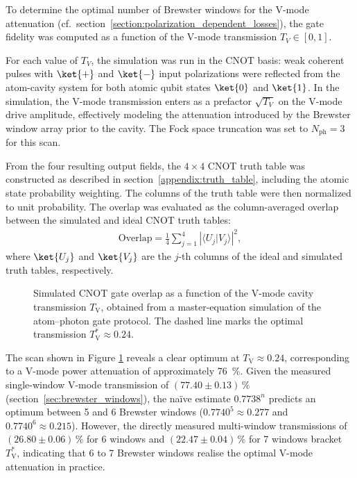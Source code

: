 To determine the optimal number of Brewster windows for the V-mode attenuation (cf.\ section~\ref{section:polarization_dependent_losses}), the gate fidelity was computed as a function of the V-mode transmission $T_V \in [0, 1]$.

For each value of $T_V$, the simulation was run in the CNOT basis: weak coherent pulses with $\ket{+}$ and $\ket{-}$ input polarizations were reflected from the atom-cavity system for both atomic qubit states $\ket{0}$ and $\ket{1}$. In the simulation, the V-mode transmission enters as a prefactor $\sqrt{T_V}$ on the V-mode drive amplitude, effectively modeling the attenuation introduced by the Brewster window array prior to the cavity. The Fock space truncation was set to $N_{\text{ph}} = 3$ for this scan.

From the four resulting output fields, the $4 \times 4$ CNOT truth table was constructed as described in section~\ref{appendix:truth_table}, including the atomic state probability weighting. The columns of the truth table were then normalized to unit probability. The overlap was evaluated as the column-averaged overlap between the simulated and ideal CNOT truth tables:
\begin{align}
	\text{Overlap} = \frac{1}{4} \sum_{j=1}^{4} \left| \langle U_j | V_j \rangle \right|^2, \label{eq:overlap}
\end{align}
where $\ket{U_j}$ and $\ket{V_j}$ are the $j$-th columns of the ideal and simulated truth tables, respectively.

\begin{figure}
	\centering
	
	\caption{Simulated CNOT gate overlap as a function of the V-mode cavity transmission $T_\mathrm{V}$, obtained from a master-equation simulation of the atom--photon gate protocol. The dashed line marks the optimal transmission $T_\mathrm{V}^* \approx 0.24$.}
	\label{fig:bw_scan_sim}
\end{figure}

The scan shown in Figure \ref{fig:bw_scan_sim} reveals a clear optimum at $T_\mathrm{V} \approx 0.24$, corresponding to a V-mode power attenuation of approximately \SI{76}{\percent}. Given the measured single-window V-mode transmission of $(\num{77.40} \pm \num{0.13})\,\si{\percent}$ (section~\ref{sec:brewster_windows}), the na\"ive estimate $0.7738^n$ predicts an optimum between 5 and 6 Brewster windows ($0.7740^5 \approx \num{0.277}$ and $0.7740^6 \approx \num{0.215}$). However, the directly measured multi-window transmissions of $(\num{26.80} \pm \num{0.06})\,\si{\percent}$ for 6 windows and $(\num{22.47} \pm \num{0.04})\,\si{\percent}$ for 7 windows bracket $T_\mathrm{V}^*$, indicating that 6 to 7 Brewster windows realise the optimal V-mode attenuation in practice.

